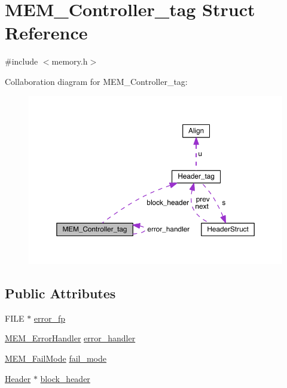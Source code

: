 \hypertarget{struct_m_e_m___controller__tag}{}\section{M\+E\+M\+\_\+\+Controller\+\_\+tag Struct Reference}
\label{struct_m_e_m___controller__tag}


{\ttfamily \#include $<$memory.\+h$>$}



Collaboration diagram for M\+E\+M\+\_\+\+Controller\+\_\+tag\+:\nopagebreak
\begin{figure}[H]
\begin{center}
\leavevmode
\includegraphics[width=350pt]{struct_m_e_m___controller__tag__coll__graph}
\end{center}
\end{figure}
\subsection*{Public Attributes}
\begin{DoxyCompactItemize}
\item 
F\+I\+L\+E $\ast$ \hyperlink{struct_m_e_m___controller__tag_a574de58b2a1928a04e5e7a7cbb1c2e37}{error\+\_\+fp}
\item 
\hyperlink{_m_e_m_8h_ade0991d07952a94a24685337fad1ca80}{M\+E\+M\+\_\+\+Error\+Handler} \hyperlink{struct_m_e_m___controller__tag_a8e66791a8c41fabb661c122942150dab}{error\+\_\+handler}
\item 
\hyperlink{_m_e_m_8h_ab9335a5fd03b90054312289c76acf8ca}{M\+E\+M\+\_\+\+Fail\+Mode} \hyperlink{struct_m_e_m___controller__tag_ac3d980809419cb5d423a4bcf8022d0c8}{fail\+\_\+mode}
\item 
\hyperlink{memory_8h_a387a413b7c06fb892e5cc4a59fe7ed17}{Header} $\ast$ \hyperlink{struct_m_e_m___controller__tag_a8cdf922b2df14ad5c169e8719d47e8fb}{block\+\_\+header}
\end{DoxyCompactItemize}


